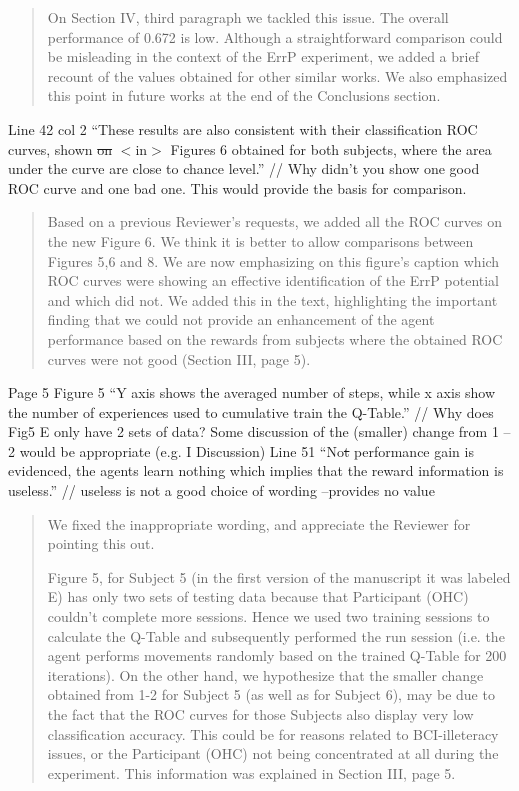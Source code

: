 \documentclass[journal,onecolumn,12pt]{IEEEtran}
\begin{document}
\begin{quotation}
{\color{blue}
On Section IV, third paragraph we tackled this issue.  The overall performance of 0.672 is low.  Although a straightforward comparison could be misleading in the context of the ErrP experiment, we added a brief recount of the values obtained for other similar works.  We also emphasized this point in future works at the end of the Conclusions section.
}
\end{quotation}

Line 42 col 2 “These results are also consistent with their classification ROC curves, shown \sout{on} $<$in$>$ Figures 6 obtained for both subjects, where the area under the curve are close to chance level.” // Why didn’t you show one good ROC curve and one bad one. This would provide the basis for comparison.

\begin{quotation}
{\color{blue}
Based on a previous Reviewer's requests, we added all the ROC curves on the new Figure 6.  We think it is better to allow comparisons between Figures 5,6 and 8.  We are now emphasizing on this figure's caption which ROC curves were showing an effective identification of the ErrP potential and which did not.  We added this in the text, highlighting the important finding that we could not provide an enhancement of the agent performance based on the rewards from subjects where the obtained ROC curves were not good (Section III, page 5).
}
\end{quotation}

Page 5
Figure 5 “Y axis shows the averaged number of steps, while x axis show the number of
experiences used to cumulative train the Q-Table.”
// Why does Fig5 E only have 2 sets of data? Some discussion of the (smaller) change from 1 – 2 would be appropriate (e.g. I Discussion)
Line 51 “No\sout{t} performance gain is evidenced, the agents learn nothing which implies that the reward information is useless.” // useless is not a good choice of wording –provides no value

\begin{quotation}
{\color{blue}
We fixed the inappropriate wording, and appreciate the Reviewer for pointing this out. 

 
Figure 5, for Subject 5 (in the first version of the manuscript it was labeled E) has only two sets of testing data because that Participant (OHC) couldn't complete more sessions.  Hence we used two training sessions to calculate the Q-Table and subsequently performed the run session (i.e. the agent performs movements randomly based on the trained Q-Table for 200 iterations).
On the other hand, we hypothesize that the smaller change obtained from 1-2 for Subject 5 (as well as for Subject 6), may be due to the fact that the ROC curves for those Subjects also display very low classification accuracy.  This could be for reasons related to BCI-illeteracy issues, or the Participant (OHC) not being  concentrated at all during the experiment.  This information was explained in Section III, page 5.
}
\end{quotation}
\end{document}
